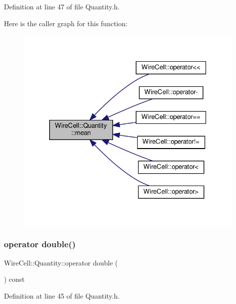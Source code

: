 Definition at line 47 of file Quantity.\+h.

Here is the caller graph for this function\+:
\nopagebreak
\begin{figure}[H]
\begin{center}
\leavevmode
\includegraphics[width=320pt]{class_wire_cell_1_1_quantity_a03e883ed20833962578c23ca9e51cd0f_icgraph}
\end{center}
\end{figure}
\mbox{\label{class_wire_cell_1_1_quantity_a808d00967fddeaa0a5aaeff938edc41d}} 
\subsubsection{\texorpdfstring{operator double()}{operator double()}}
{\footnotesize\ttfamily Wire\+Cell\+::\+Quantity\+::operator double (\begin{DoxyParamCaption}{ }\end{DoxyParamCaption}) const\hspace{0.3cm}{\ttfamily [inline]}}



Definition at line 45 of file Quantity.\+h.

\mbox{\label{class_wire_cell_1_1_quantity_a730b08268aeacd7587795dfc449ba61b}} 
